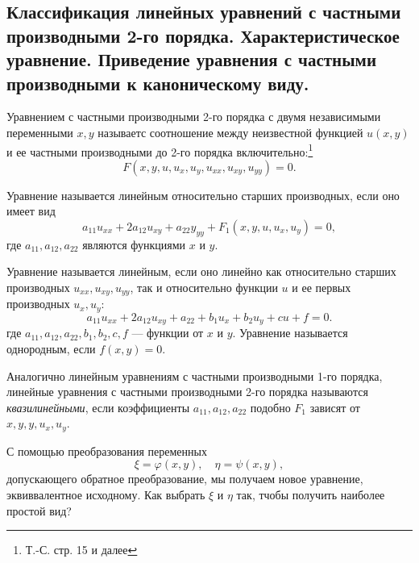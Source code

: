 \subsection{Классификация линейных уравнений с частными производными 2-го порядка. Характеристическое уравнение. Приведение уравнения с частными производными к каноническому виду.}
\label{sec:types}

Уравнением с частными производными 2-го порядка с двумя независимыми переменными $x, y$ называетс соотношение между неизвестной функцией $ u(x, y)$ и ее частными производными до 2-го порядка включительно:\footnote{Т.-С. стр. 15 и далее}
\begin{equation}
	F(x, y, u, u_x, u_y, u_{xx}, u_{xy}, u_{yy}) = 0.
\end{equation}

Уравнение называется линейным относительно старших производных, если оно имеет вид
\begin{equation} \label{SOlineq}
	a_{11} u_{xx} + 2 a_{12} u_{xy} + a_{22} y_{yy} + F_1(x, y, u, u_x, u_y) = 0,
\end{equation}
где $a_{11}, a_{12}, a_{22}$ являются функциями $x$ и $y$.

Уравнение называется линейным, если оно линейно как относительно старших производных $u_{xx}, u_{xy}, u_{yy}$, так и относительно функции $u$ и ее первых производных $u_x, u_y$:
\begin{equation} \label{SOeq}
	a_{11}  u_{xx} + 2 a_{12} u_{xy} + a_{22} + b_1 u_x + b_2 u_y + c u + f = 0. 
\end{equation}
где $a_{11}, a_{12}, a_{22}, b_1, b_2, c, f$ --- функции от $x$ и $y$. Уравнение называется однородным, если $f(x, y) = 0$.

Аналогично линейным уравнениям с частными производными 1-го порядка, линейные уравнения с частными производными 2-го порядка называются \textit{квазилинейными}, если коэффициенты $a_{11}, a_{12}, a_{22}$ подобно $F_1$ зависят от $x, y, y, u_x, u_y$. 

С помощью преобразования переменных
\begin{equation*}
	\xi = \varphi(x, y), \quad \eta = \psi(x, y),
\end{equation*}
допускающего обратное преобразование, мы получаем новое уравнение, эквиввалентное исходному. Как выбрать $\xi$ и $\eta$ так, тчобы получить наиболее простой вид?

